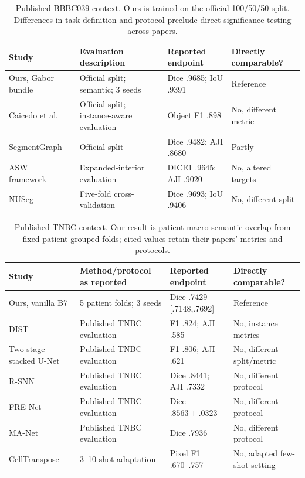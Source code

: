 \documentclass{article}
\begin{document}
\begin{table}[t]
\centering\small
\caption{Published BBBC039 context. Ours is trained on the official 100/50/50 split. Differences in task definition and protocol preclude direct significance testing across papers.}
\label{tab:lit_bbbc}
\setlength{\tabcolsep}{5pt}
\begin{tabular}{@{}llll@{}}\toprule
Study & Evaluation description & Reported endpoint & Directly comparable?\\\midrule
Ours, Gabor bundle & Official split; semantic; 3 seeds & Dice .9685; IoU .9391 & Reference\\
Caicedo et al.~\cite{caicedo2019evaluation} & Official split; instance-aware evaluation & Object F1 .898 & No, different metric\\
SegmentGraph~\cite{yi2022segmentgraph} & Official split & Dice .9482; AJI .8680 & Partly\\
ASW framework~\cite{wang2022aswnet} & Expanded-interior evaluation & DICE1 .9645; AJI .9020 & No, altered targets\\
NUSeg~\cite{wickramasinghe2024nuseg} & Five-fold cross-validation & Dice .9693; IoU .9406 & No, different split\\\bottomrule
\end{tabular}
\end{table}

\begin{table}[t]
\centering\small
\caption{Published TNBC context. Our result is patient-macro semantic overlap from fixed patient-grouped folds; cited values retain their papers' metrics and protocols.}
\label{tab:lit_tnbc}
\setlength{\tabcolsep}{4.5pt}
\begin{tabular}{@{}llll@{}}\toprule
Study & Method/protocol as reported & Reported endpoint & Directly comparable?\\\midrule
Ours, vanilla B7 & 5 patient folds; 3 seeds & Dice .7429 [.7148,.7692] & Reference\\
DIST~\cite{naylor2019segmentation,kang2020twostage} & Published TNBC evaluation & F1 .824; AJI .585 & No, instance metrics\\
Two-stage stacked U-Net~\cite{kang2020twostage} & Published TNBC evaluation & F1 .806; AJI .621 & No, different split/metric\\
R-SNN~\cite{mahmood2021accurate} & Published TNBC evaluation & Dice .8441; AJI .7332 & No, different protocol\\
FRE-Net~\cite{huang2023frenet} & Published TNBC evaluation & Dice $.8563\!\pm\!.0323$ & No, different protocol\\
MA-Net~\cite{alotaibi2024manet} & Published TNBC evaluation & Dice .7936 & No, different protocol\\
CellTranspose~\cite{he2023celltranspose} & 3--10-shot adaptation & Pixel F1 .670--.757 & No, adapted few-shot setting\\\bottomrule
\end{tabular}
\end{table}
\end{document}
